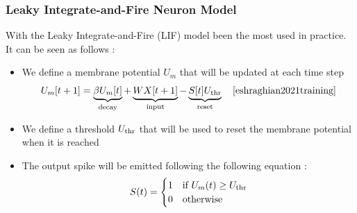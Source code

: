 \documentclass[11pt]{article}
\begin{document}
\subsubsection{Leaky Integrate-and-Fire Neuron Model}

With the Leaky Integrate-and-Fire (LIF) model been the most used in practice. It can be seen as follows :

\begin{itemize}
  \item We define a membrane potential $U_m$ that will be updated at each time step
        \begin{equation}
          U_m[t+1] = \underbrace{\beta U_m[t]}_\text{decay} + \underbrace{WX[t+1]}_\text{input} - \underbrace{S[t]U_{\rm thr}}_\text{reset}  \quad \text{\cite{eshraghian2021training}}
        \end{equation}

  \item We define a threshold $U_{\rm thr}$ that will be used to reset the membrane potential when it is reached
  \item The output spike will be emitted following the following equation :
        \begin{equation}
          S(t) = \begin{cases}
            1 & \text{if } U_m(t) \geq U_{\rm thr} \\
            0 & \text{otherwise}
          \end{cases}
        \end{equation}
\end{itemize}
\end{document}
